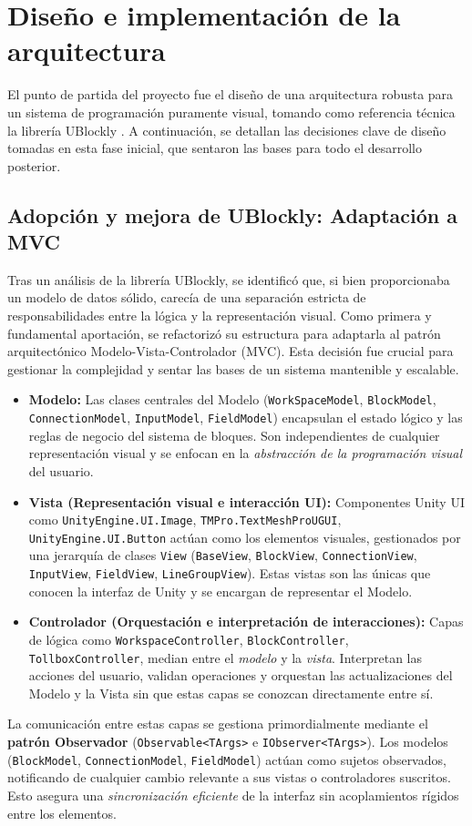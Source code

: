 \section{Diseño e implementación de la arquitectura }

 El punto de partida del proyecto fue el diseño de una arquitectura robusta para un sistema de programación puramente visual, tomando como referencia técnica la librería UBlockly \cite{UBlockly}. A continuación, se detallan las decisiones clave de diseño tomadas en esta fase inicial, que sentaron las bases para todo el desarrollo posterior.
 
\subsection{Adopción y mejora de UBlockly: Adaptación a MVC}
Tras un análisis de la librería UBlockly, se identificó que, si bien proporcionaba un modelo de datos sólido, carecía de una separación estricta de responsabilidades entre la lógica y la representación visual. Como primera y fundamental aportación, se refactorizó su estructura para adaptarla al patrón arquitectónico Modelo-Vista-Controlador (MVC). Esta decisión fue crucial para gestionar la complejidad y sentar las bases de un sistema mantenible y escalable.
\begin{itemize}
	\item \textbf{Modelo:} Las clases centrales del Modelo (\texttt{WorkSpaceModel}, \texttt{BlockModel}, \texttt{ConnectionModel}, \texttt{InputModel}, \texttt{FieldModel}) encapsulan el estado lógico y las reglas de negocio del sistema de bloques. Son independientes de cualquier representación visual y se enfocan en la \textit{abstracción de la programación visual} del usuario.
	\item \textbf{Vista (Representación visual e interacción UI):} Componentes Unity UI como \texttt{UnityEngine.UI.Image}, \texttt{TMPro.TextMeshProUGUI}, \texttt{UnityEngine.UI.Button} actúan como los elementos visuales, gestionados por una jerarquía de clases \texttt{View} (\texttt{BaseView}, \texttt{BlockView}, \texttt{ConnectionView}, \texttt{InputView}, \texttt{FieldView}, \texttt{LineGroupView}). Estas vistas son las únicas que conocen la interfaz de Unity y se encargan de representar el Modelo.
	\item \textbf{Controlador (Orquestación e interpretación de interacciones):} Capas de lógica como  \texttt{WorkspaceController}, \texttt{BlockController}, \texttt{TollboxController}, median entre el \textit{modelo} y la \textit{vista}. Interpretan las acciones del usuario, validan operaciones y orquestan las actualizaciones del Modelo y la Vista sin que estas capas se conozcan directamente entre sí.
\end{itemize}
La comunicación entre estas capas se gestiona primordialmente mediante el \textbf{patrón Observador} (\texttt{Observable<TArgs>} e \texttt{IObserver<TArgs>}). Los modelos (\texttt{BlockModel}, \texttt{ConnectionModel}, \texttt{FieldModel}) actúan como sujetos observados, notificando de cualquier cambio relevante a sus vistas o controladores suscritos. Esto asegura una \textit{sincronización eficiente} de la interfaz sin acoplamientos rígidos entre los elementos. 

